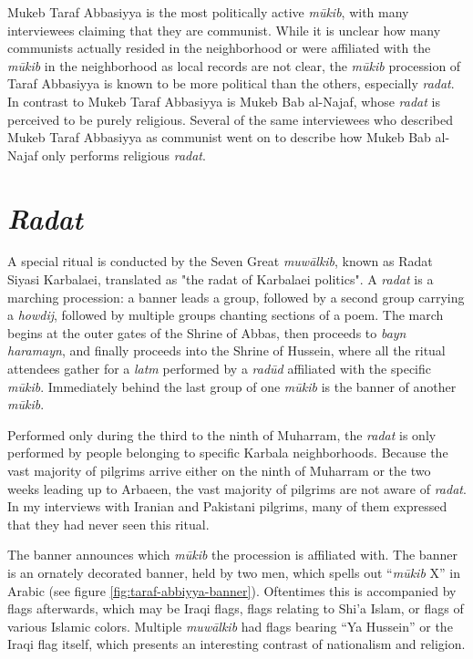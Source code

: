 Mukeb Taraf Abbasiyya is the most politically active \emph{mūkib}, with many interviewees claiming that they are communist. While it is unclear how many communists actually resided in the neighborhood or were affiliated with the \emph{mūkib} in the neighborhood as local records are not clear, the \emph{mūkib} procession of Taraf Abbasiyya is known to be more political than the others, especially \emph{radat}. In contrast to Mukeb Taraf Abbasiyya is Mukeb Bab al-Najaf, whose \emph{radat} is perceived to be purely religious. Several of the same interviewees who described Mukeb Taraf Abbasiyya as communist went on to describe how Mukeb Bab al-Najaf only performs religious \emph{radat}. 

\section{\emph{Radat}}
A special ritual is conducted by the Seven Great \emph{muwālkib}, known as Radat Siyasi Karbalaei, translated as "the radat of Karbalaei politics". A \emph{radat} is a marching procession: a banner leads a group, followed by a second group carrying a \emph{howdij}, followed by multiple groups chanting sections of a poem. The march begins at the outer gates of the Shrine of Abbas, then proceeds to \emph{bayn haramayn}, and finally proceeds into the Shrine of Hussein, where all the ritual attendees gather for a \emph{latm} performed by a \emph{radūd} affiliated with the specific \emph{mūkib}. Immediately behind the last group of one \emph{mūkib} is the banner of another \emph{mūkib}. 

Performed only during the third to the ninth of Muharram, the \emph{radat} is only performed by people belonging to specific Karbala neighborhoods. Because the vast majority of pilgrims arrive either on the ninth of Muharram or the two weeks leading up to Arbaeen, the vast majority of pilgrims are not aware of \emph{radat}. In my interviews with Iranian and Pakistani pilgrims, many of them expressed that they had never seen this ritual. 

The banner announces which \emph{mūkib} the procession is affiliated with. The banner is an ornately decorated banner, held by two men, which spells out “\emph{mūkib} X” in Arabic (see figure \ref{fig:taraf-abbiyya-banner}). Oftentimes this is accompanied by flags afterwards, which may be Iraqi flags, flags relating to Shi'a Islam, or flags of various Islamic colors. Multiple \emph{muwālkib} had flags bearing “Ya Hussein” or the Iraqi flag itself, which presents an interesting contrast of nationalism and religion. 

